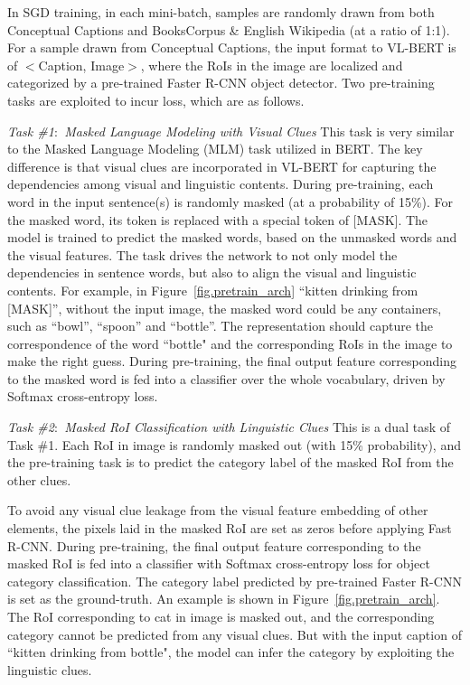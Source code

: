 In SGD training, in each mini-batch, samples are randomly drawn from both Conceptual Captions and BooksCorpus \& English Wikipedia (at a ratio of 1:1). For a sample drawn from Conceptual Captions, the input format to VL-BERT is of $<$Caption, Image$>$, where the RoIs in the image are localized and categorized by a pre-trained Faster R-CNN object detector. Two pre-training tasks are exploited to incur loss, which are as follows.

\emph{Task \#1$\colon$ Masked Language Modeling with Visual Clues} This task is very similar to the Masked Language Modeling (MLM) task utilized in BERT. The key difference is that visual clues are incorporated in VL-BERT for capturing the dependencies among visual and linguistic contents. During pre-training, each word in the input sentence(s) is randomly masked (at a probability of 15\%). For the masked word, its token is replaced with a special token of [MASK]. The model is trained to predict the masked words, based on the unmasked words and the visual features. The task drives the network to not only model the dependencies in sentence words, but also to align the visual and linguistic contents. For example, in Figure~\ref{fig.pretrain_arch} ``kitten drinking from [MASK]'', without the input image, the masked word could be any containers, such as ``bowl'', ``spoon'' and ``bottle''. The representation should capture the correspondence of the word ``bottle" and the corresponding RoIs in the image to make the right guess. During pre-training, the final output feature corresponding to the masked word is fed into a classifier over the whole vocabulary, driven by Softmax cross-entropy loss.

\emph{Task \#2$\colon$ Masked RoI Classification with Linguistic Clues} This is a dual task of Task \#1. Each RoI in image is randomly masked out (with 15\% probability), and the pre-training task is to predict the category label of the masked RoI from the other clues. 

To avoid any visual clue leakage from the visual feature embedding of other elements, the pixels laid in the masked RoI are set as zeros before applying Fast R-CNN. During pre-training, the final output feature corresponding to the masked RoI is fed into a classifier with Softmax cross-entropy loss for object category classification. The category label predicted by pre-trained Faster R-CNN is set as the ground-truth. An example is shown in Figure~\ref{fig.pretrain_arch}. The RoI corresponding to cat in image is masked out, and the corresponding category cannot be predicted from any visual clues. But with the input caption of ``kitten drinking from bottle", the model can infer the category by exploiting the linguistic clues.

